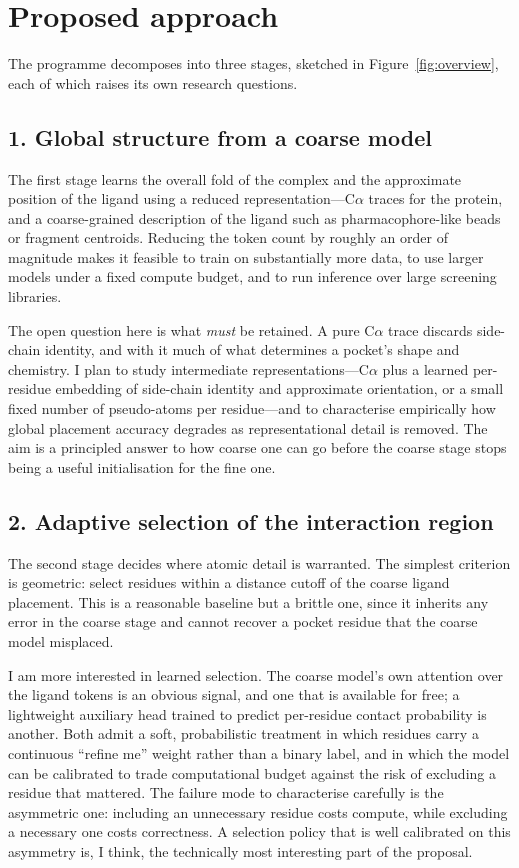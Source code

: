 \documentclass[11pt]{article}
\begin{document}
\section*{Proposed approach}

The programme decomposes into three stages, sketched in Figure~\ref{fig:overview}, each of which
raises its own research questions.

\subsection*{1. Global structure from a coarse model}

The first stage learns the overall fold of the complex and the approximate position of the ligand
using a reduced representation---C$\alpha$ traces for the protein, and a coarse-grained description
of the ligand such as pharmacophore-like beads or fragment centroids. Reducing the token count by
roughly an order of magnitude makes it feasible to train on substantially more data, to use larger
models under a fixed compute budget, and to run inference over large screening libraries.

The open question here is what \emph{must} be retained. A pure C$\alpha$ trace discards side-chain
identity, and with it much of what determines a pocket's shape and chemistry. I plan to study
intermediate representations---C$\alpha$ plus a learned per-residue embedding of side-chain
identity and approximate orientation, or a small fixed number of pseudo-atoms per residue---and to
characterise empirically how global placement accuracy degrades as representational detail is
removed. The aim is a principled answer to how coarse one can go before the coarse stage stops
being a useful initialisation for the fine one.

\subsection*{2. Adaptive selection of the interaction region}

The second stage decides where atomic detail is warranted. The simplest criterion is geometric:
select residues within a distance cutoff of the coarse ligand placement. This is a reasonable
baseline but a brittle one, since it inherits any error in the coarse stage and cannot recover a
pocket residue that the coarse model misplaced.

I am more interested in learned selection. The coarse model's own attention over the ligand tokens
is an obvious signal, and one that is available for free; a lightweight auxiliary head trained to
predict per-residue contact probability is another. Both admit a soft, probabilistic treatment in
which residues carry a continuous ``refine me'' weight rather than a binary label, and in which the
model can be calibrated to trade computational budget against the risk of excluding a residue that
mattered. The failure mode to characterise carefully is the asymmetric one: including an
unnecessary residue costs compute, while excluding a necessary one costs correctness. A selection
policy that is well calibrated on this asymmetry is, I think, the technically most interesting part
of the proposal.
\end{document}
